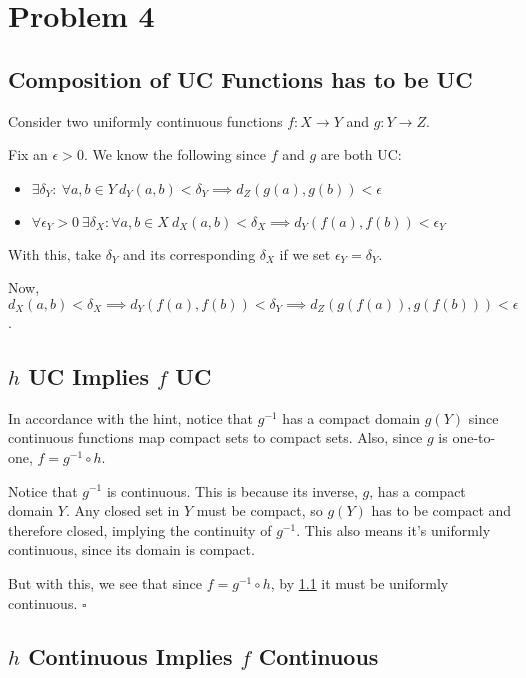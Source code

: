 \documentclass[12pt]{article}
\begin{document}
\pagebreak

\section{Problem 4}

\subsection{Composition of UC Functions has to be UC}\label{sec:prob4lemma}

Consider two uniformly continuous functions $f: X \to Y$ and $g: Y \to Z$.

Fix an $\epsilon > 0$. We know the following since $f$ and $g$ are both UC:
\begin{itemize}
  \item $\exists \delta_Y:\ \forall a, b \in Y\ d_Y(a, b) < \delta_Y \implies d_Z(g(a), g(b)) < \epsilon$
  \item $\forall \epsilon_Y > 0\ \exists \delta_X: \forall a, b \in X\ d_X(a, b) < \delta_X \implies d_Y(f(a), f(b)) < \epsilon_Y$
\end{itemize}
With this, take $\delta_Y$ and its corresponding $\delta_X$ if we set $\epsilon_Y=\delta_Y$.

Now, $d_X(a, b) < \delta_X \implies d_Y(f(a), f(b)) < \delta_Y \implies d_Z(g(f(a)), g(f(b))) < \epsilon$.

\subsection{\texorpdfstring{$h$}{h} UC Implies \texorpdfstring{$f$}{f} UC}

In accordance with the hint, notice that $g^{-1}$ has a compact domain $g(Y)$
since continuous functions map compact sets to compact sets.
Also, since $g$ is one-to-one, $f=g^{-1} \circ h$.

Notice that $g^{-1}$ is continuous.
This is because its inverse, $g$, has a compact domain $Y$.
Any closed set in $Y$ must be compact, so $g(Y)$ has to be compact and therefore closed,
implying the continuity of $g^{-1}$.
This also means it's uniformly continuous, since its domain is compact.

But with this, we see that since $f=g^{-1} \circ h$, by \ref{sec:prob4lemma}
it must be uniformly continuous. $\square$

\subsection{\texorpdfstring{$h$}{h} Continuous Implies \texorpdfstring{$f$}{f} Continuous}
\end{document}
